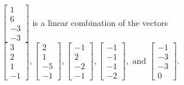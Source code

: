 \begin{exercise}
\begin{exerciseStatement}
  \end{exerciseStatement}
  \begin{exerciseAnswer}
   \(\left[\begin{array}{c}
1 \\
6 \\
-3 \\
-3
\end{array}\right]\) 
  	 is  
	a linear combination of the vectors \(\left[\begin{array}{c}
3 \\
2 \\
1 \\
-1
\end{array}\right] , \left[\begin{array}{c}
2 \\
1 \\
-5 \\
-1
\end{array}\right] , \left[\begin{array}{c}
-1 \\
2 \\
-2 \\
-1
\end{array}\right] , \left[\begin{array}{c}
-1 \\
-1 \\
-1 \\
-2
\end{array}\right] , \text{ and } \left[\begin{array}{c}
-1 \\
-3 \\
-3 \\
0
\end{array}\right]\).

	
  


  \end{exerciseAnswer}
\end{exercise}